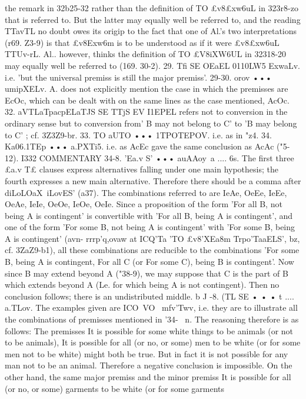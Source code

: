 {{{{{the remark in 32b25-32 rather than the definition of TO £v8£xw6uL
in 323r8-zo that is referred to. But the latter may equally well
be referred to, and the reading TTavTL no doubt owes its origip to
the fact that one of Al.'s two interpretations (r69. Z3-9) is that
£v8Exw6m is to be understood as if it were £v8£xw6uL TTUv-rL. Al..
however, thinks the definition of TO £V8iXW6UL in 32318-20 may
equally well be referred to (169. 30-2).
29. Tfi SE OEaEL 0110LW5 ExwaLv. i.e. 'but the universal premiss
is still the major premiss'.
29-30. orov ••• umipXELv. A. does not explicitly mention the
case in which the premisses are EcOc, which can be dealt with on
the same lines as the case mentioned, AcOc.
32. aVTLaTpacpELaTJS SE TTjS EV I1EPEL refers not to conversion in
the ordinary sense but to conversion from' B may not belong to
C' to 'B may belong to C' ; cf. 3Z3Z9-br.
33. TO aUTO ••• 1TPOTEPOV. i.e. as in "z4.
34. Ka06.1TEp ••• a.PXTi5. i.e. as AcEc gave the same conclusion
as AcAc ("5-12).
I332
COMMENTARY
34-8. 'Ea.v S' ••• auAAoy~a .... 6s. The first three £a.v T£ clauses
express alternatives falling under one main hypothesis; the
fourth expresses a new main alternative. Therefore there should
be a comma after diLoLOaX~iLovES' (a37).
The combinations referred to are IeAe, OeEe, IeEe, OeAe, IeIe,
OeOe, IeOe, OeIe. Since a proposition of the form 'For all B,
not being A is contingent' is convertible with 'For all B, being
A is contingent', and one of the form 'For some B, not being A
is contingent' with 'For some B, being A is contingent' (avn-
rrrp'q,ovaw at ICQ'Ta 'TO £v8'XEa8m Trpo'TaaELS', bz, cf. 3ZaZ9-b1), all
these combinations are reducible to the combinations 'For some
B, being A is contingent, For all C (or For some C), being B is
contingent'. Now since B may extend beyond A ("38-9), we may
suppose that C is the part of B which extends beyond A (Le. for
which being A is not contingent). Then no conclusion follows;
there is an undistributed middle.
b J -8. (TL SE • • • t .... a.TLov.
The examples given are ICO~VO~
mfv'Twv, i.e. they are to illustrate all the combinations of premisses
mentioned in '34-~ n. The reasoning therefore is as follows: The
premisses It is possible for some white things to be animals (or
not to be animals), It is possible for all (or no, or some) men
to be white (or for some men not to be white) might both be
true. But in fact it is not possible for any man not to be an animal.
Therefore a negative conclusion is impossible. On the other hand,
the same major premiss and the minor premiss It is possible for
all (or no, or some) garments to be white (or for some garments
}}}}}
